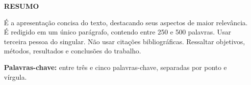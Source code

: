 
\thispagestyle{empty}
\begin{center}
  \vspace*{.85cm}
  \textbf{RESUMO}
\end{center}

\vspace{2.5cm}
\noindent
\leading{5.5mm}
É a apresentação concisa do texto, destacando seus aspectos de maior relevância.
É redigido em um único parágrafo, contendo entre 250 e 500 palavras. Usar
terceira pessoa do singular. Não usar citações bibliográficas. Ressaltar
objetivos, métodos, resultados e conclusões do trabalho.

\vspace{1.3cm}

\noindent
\textbf{Palavras-chave:} entre três e cinco palavras-chave, separadas por ponto
e vírgula.
